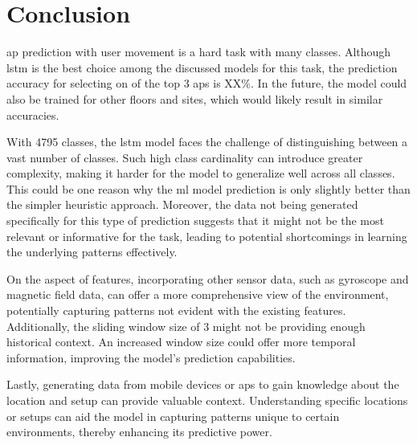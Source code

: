 \chapter{Conclusion}\label{ch:conclusion}
 
\ac{ap} prediction with user movement is a hard task with many classes.
Although \ac{lstm} is the best choice among the discussed models for this task, the prediction accuracy for selecting on of the top 3 \acp{ap} is XX\%.
In the future, the model could also be trained for other floors and sites, which would likely result in similar accuracies.

With 4795 classes, the \ac{lstm} model faces the challenge of distinguishing between a vast number of classes.
Such high class cardinality can introduce greater complexity, making it harder for the model to generalize well across all classes.
This could be one reason why the \ac{ml} model prediction is only slightly better than the simpler heuristic approach.
Moreover, the data not being generated specifically for this type of prediction suggests that it might not be the most relevant or informative for the task, leading to potential shortcomings in learning the underlying patterns effectively.

On the aspect of features, incorporating other sensor data, such as gyroscope and magnetic field data, can offer a more comprehensive view of the environment, potentially capturing patterns not evident with the existing features.
Additionally, the sliding window size of 3 might not be providing enough historical context. An increased window size could offer more temporal information, improving the model's prediction capabilities.

Lastly, generating data from mobile devices or \acp{ap} to gain knowledge about the location and setup can provide valuable context.
Understanding specific locations or setups can aid the model in capturing patterns unique to certain environments, thereby enhancing its predictive power.
